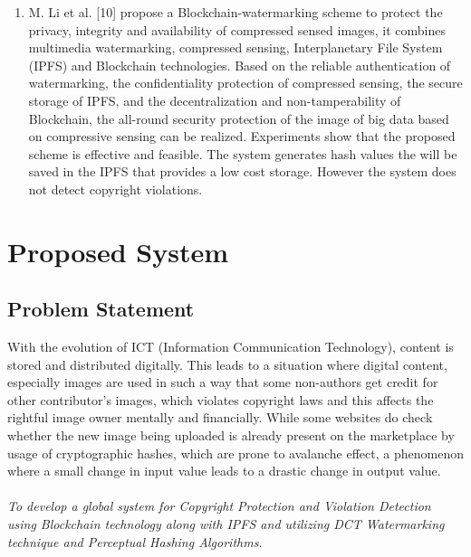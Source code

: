 \documentclass[10pt]{article}
\begin{document}
\begin{enumerate}
\item  M. Li et al. [10] propose a Blockchain-watermarking scheme to protect the privacy, integrity and availability of compressed sensed images, it combines multimedia watermarking, compressed sensing, Interplanetary File System (IPFS) and Blockchain technologies. Based on the reliable authentication of watermarking, the confidentiality protection of compressed sensing, the secure storage of IPFS, and the decentralization and non-tamperability of Blockchain, the all-round security protection of the image of big data based on compressive sensing can be realized. Experiments show that the proposed scheme is effective and feasible. The system generates hash values the will be saved in the IPFS that provides a low cost storage. However the system does not detect copyright violations.
\end{enumerate}
\section{Proposed System}
\subsection{Problem Statement}
With the evolution of ICT (Information Communication Technology), content is stored and distributed digitally. This leads to a situation where digital content, especially images are used in such a way that some non-authors get credit for other contributor’s images, which violates copyright laws and this affects the rightful image owner mentally and financially. While some websites do check whether the new image being uploaded is already present on the marketplace by usage of cryptographic hashes, which are prone to avalanche effect, a phenomenon where a small change in input value leads to a drastic change in output value. \\
\\\emph{To develop a global system for Copyright Protection and Violation Detection using Blockchain technology along with IPFS and utilizing DCT Watermarking technique and Perceptual Hashing Algorithms}.
\end{document}
